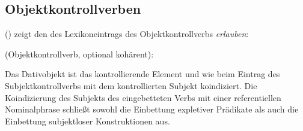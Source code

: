 {%
%


\subsection{Objektkontrollverben}
\label{sec-object-control-anal}

%
() zeigt den \localw des Lexikoneintrags des Objektkontrollverbs \emph{erlauben}:


\eas
{} (Objektkontrollverb, optional kohärent):\\
\zs{}

\noindent
Das Dativobjekt ist das kontrollierende Element und wie beim Eintrag des Subjektkontrollverbs
mit dem kontrollierten Subjekt koindiziert. Die Koindizierung des Subjekts des eingebetteten
Verbs mit einer referentiellen Nominalphrase schließt sowohl die Einbettung expletiver Prädikate
als auch die Einbettung subjektloser Konstruktionen aus.

}
